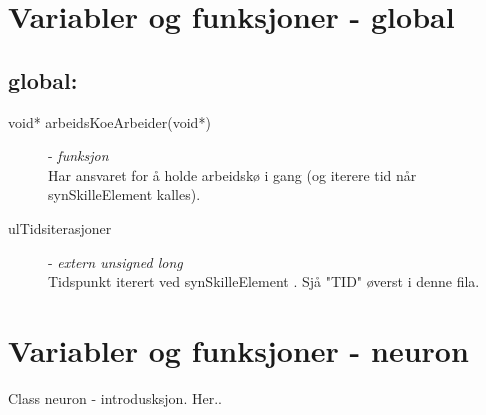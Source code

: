 \documentclass[norsk,11 pt]{report}
\begin{document}



\chapter{Variabler og funksjoner - global}
\section{global:}
	\begin{description}
		\item[void* arbeidsKoeArbeider(void*)] - \textit{funksjon} \\
			Har ansvaret for å holde arbeidskø i gang (og iterere tid når synSkilleElement kalles). 
		\item[ulTidsiterasjoner] - \textit{extern unsigned long} \\
			Tidspunkt iterert ved synSkilleElement . Sjå "TID" øverst i denne fila.
	\end{description}

\pagebreak




\chapter{Variabler og funksjoner - neuron}
	Class neuron - introdusksjon. Her..
\end{document}
